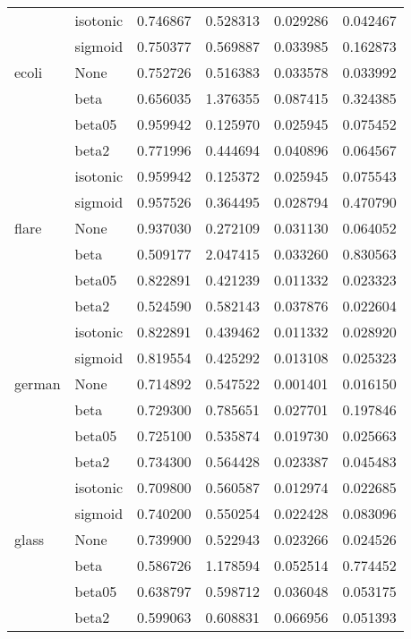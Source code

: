 \begin{tabular}{llrrrr}
        & isotonic &  0.746867 &   0.528313 &  0.029286 &  0.042467 \\
        & sigmoid &  0.750377 &   0.569887 &  0.033985 &  0.162873 \\
ecoli & None &  0.752726 &   0.516383 &  0.033578 &  0.033992 \\
        & beta &  0.656035 &   1.376355 &  0.087415 &  0.324385 \\
        & beta05 &  0.959942 &   0.125970 &  0.025945 &  0.075452 \\
        & beta2 &  0.771996 &   0.444694 &  0.040896 &  0.064567 \\
        & isotonic &  0.959942 &   0.125372 &  0.025945 &  0.075543 \\
        & sigmoid &  0.957526 &   0.364495 &  0.028794 &  0.470790 \\
flare & None &  0.937030 &   0.272109 &  0.031130 &  0.064052 \\
        & beta &  0.509177 &   2.047415 &  0.033260 &  0.830563 \\
        & beta05 &  0.822891 &   0.421239 &  0.011332 &  0.023323 \\
        & beta2 &  0.524590 &   0.582143 &  0.037876 &  0.022604 \\
        & isotonic &  0.822891 &   0.439462 &  0.011332 &  0.028920 \\
        & sigmoid &  0.819554 &   0.425292 &  0.013108 &  0.025323 \\
german & None &  0.714892 &   0.547522 &  0.001401 &  0.016150 \\
        & beta &  0.729300 &   0.785651 &  0.027701 &  0.197846 \\
        & beta05 &  0.725100 &   0.535874 &  0.019730 &  0.025663 \\
        & beta2 &  0.734300 &   0.564428 &  0.023387 &  0.045483 \\
        & isotonic &  0.709800 &   0.560587 &  0.012974 &  0.022685 \\
        & sigmoid &  0.740200 &   0.550254 &  0.022428 &  0.083096 \\
glass & None &  0.739900 &   0.522943 &  0.023266 &  0.024526 \\
        & beta &  0.586726 &   1.178594 &  0.052514 &  0.774452 \\
        & beta05 &  0.638797 &   0.598712 &  0.036048 &  0.053175 \\
        & beta2 &  0.599063 &   0.608831 &  0.066956 &  0.051393 \\

\end{tabular}
